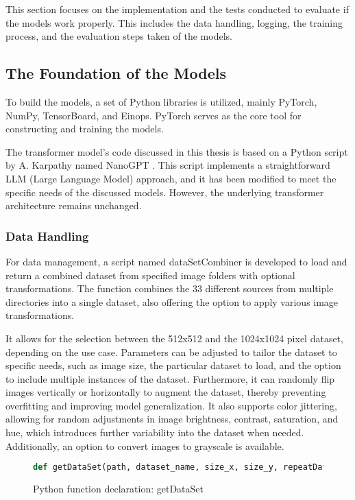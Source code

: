 
    This section focuses on the implementation and the tests conducted to evaluate if the models work properly. This includes the data handling, logging, the training process, and the evaluation steps taken of the models. 


    \subsection{The Foundation of the Models}

    To build the models, a set of Python libraries is utilized, mainly PyTorch, NumPy, TensorBoard, and Einops. PyTorch serves as the core tool for constructing and training the models.
    
    The transformer model's code discussed in this thesis is based on a Python script by A. Karpathy named NanoGPT \autocite{nanoGPTkarpathy2023}. This script implements a straightforward LLM (Large Language Model) approach, and it has been modified to meet the specific needs of the discussed models. However, the underlying transformer architecture remains unchanged.
    
    \subsubsection{Data Handling}
    \label{sec:DataHandling}

    For data management, a script named dataSetCombiner is developed to load and return a combined dataset from specified image folders with optional transformations. The function combines the 33 different sources from multiple directories into a single dataset, also offering the option to apply various image transformations.
    
    It allows for the selection between the 512x512 and the 1024x1024 pixel dataset, depending on the use case. Parameters can be adjusted to tailor the dataset to specific needs, such as image size, the particular dataset to load, and the option to include multiple instances of the dataset. Furthermore, it can randomly flip images vertically or horizontally to augment the dataset, thereby preventing overfitting and improving model generalization. It also supports color jittering, allowing for random adjustments in image brightness, contrast, saturation, and hue, which introduces further variability into the dataset when needed. Additionally, an option to convert images to grayscale is available.
    

\begin{figure}[H]
\centering
\begin{lstlisting}[language=Python]
    def getDataSet(path, dataset_name, size_x, size_y, repeatData=1, random_vertical_flip=False, random_horizontal_flip=False, crop_type='random', grayscale=False, color_jitter=False, jitter_brightness=0, jitter_contrast=0, jitter_saturation=0, jitter_hue=0):
\end{lstlisting}
\caption{Python function declaration: getDataSet}
\label{fig:getDataSet}
\end{figure}


